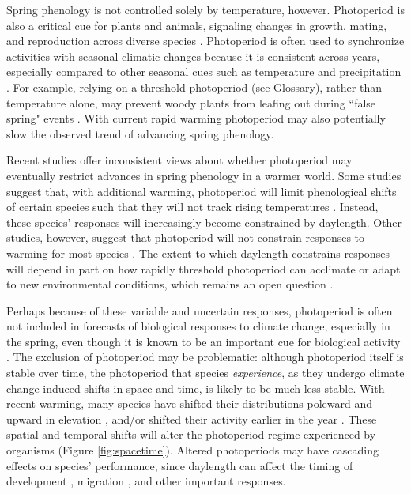 \documentclass{article}
\begin{document}
\par Spring phenology is not controlled solely by temperature, however. Photoperiod is also a critical cue for plants and animals, signaling changes in growth, mating, and reproduction across diverse species \citep[e.g.,][]{Howe:1996,flynn2018,solbakken1994,mcallan2006,lagercrantz2009}. Photoperiod is often used to synchronize activities with seasonal climatic changes \citep[e.g.,][]{Hsu:2011,Singh:2017,Basler:2012} because it is consistent across years, especially compared to other seasonal cues such as temperature and precipitation \citep{saikkonen2012}. For example, relying on a threshold photoperiod (see Glossary), rather than temperature alone, may prevent woody plants from leafing out during ``false spring" events \citep[unusually warm periods during winter that are followed by a return of cold temperatures,][] {Gu2008}. With current rapid warming photoperiod may also potentially slow the observed trend of advancing spring phenology. 

\par Recent studies offer inconsistent views about whether photoperiod may eventually restrict advances in spring phenology in a warmer world. Some studies suggest that, with additional warming, photoperiod will limit phenological shifts of certain species such that they will not track rising temperatures \citep[e.g., by leafing out earlier in the spring,][]{koerner2010b,way2015}. Instead, these species' responses will increasingly become constrained by daylength. Other studies, however, suggest that photoperiod will not constrain responses to warming for most species \citep{zohner2016,chuine2010}. The extent to which daylength constrains responses will depend in part on how rapidly threshold photoperiod can acclimate or adapt to new environmental conditions, which remains an open question \citep{grevstad2015}.

\par Perhaps because of these variable and uncertain responses, photoperiod is often not included in forecasts of biological responses to climate change, especially in the spring, even though it is known to be an important cue for biological activity \citep[but see ][]{duputie2015,Caffarra:2011qf,grevstad2015}. The exclusion of photoperiod may be problematic: although photoperiod itself is stable over time, the photoperiod that species \emph{experience}, as they undergo climate change-induced shifts in space and time, is likely to be much less stable. With recent warming, many species have shifted their distributions poleward and upward in elevation \citep[i.e., range shifts,][]{parmesan2006,chen2011,harsch2009,penuelas2003}, and/or shifted their activity earlier in the year \citep[i.e., phenological shifts][]{parmesan2006, Wolkovich:2012n}. These spatial and temporal shifts will alter the photoperiod regime experienced by organisms (Figure \ref{fig:spacetime}).  Altered photoperiods may have cascading effects on species' performance, since daylength can affect the timing of development \citep{muir1994,grevstad2015}, migration \citep{dawbin1966}, and other important responses. 
\end{document}
